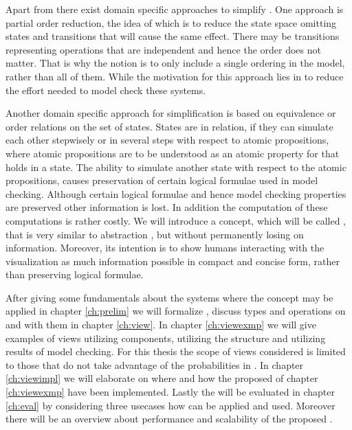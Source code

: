 \documentclass[preview]{standalone}
\begin{document}
Apart from  there exist domain specific approaches to simplify \mdpsN. One approach is partial order reduction, the idea of which is to reduce the state space omitting states and transitions that will cause the same effect. There may be transitions representing operations that are independent and hence the order does not matter. That is why the notion is to only include a single ordering in the model, rather than all of them. While the motivation for this approach lies in to reduce the effort needed to model check these systems. 

Another domain specific approach for simplification is based on equivalence or order relations on the set of states. States are in relation, if they can simulate each other stepwisely or in several steps with respect to atomic propositions, where atomic propositions are to be understood as an atomic property for that holds in a state. The ability to simulate another state with respect to the atomic propositions, causes preservation of certain logical formulae used in model checking. Although certain logical formulae and hence model checking properties are preserved other information is lost. In addition the computation of these computations is rather costly. We will introduce a concept, which will be called \viewN, that is very similar to abstraction \cite[pp. 499]{Baier2008}, but without permanently losing on information. Moreover, its intention is to show humans interacting with the visualization as much information possible in compact and concise form, rather than preserving logical formulae.

After giving some fundamentals about the systems where the concept \viewN may be applied in chapter \ref{ch:prelim} we will formalize \viewsN, discuss types and operations on and with them in chapter \ref{ch:view}. In chapter \ref{ch:viewexmp} we will give examples of views utilizing \chgphN components, \viewsN utilizing the \chgphN structure and \viewsN utilizing results of model checking. For this thesis the scope of views considered is limited to those that do not take advantage of the probabilities in \chgphsN. In chapter \ref{ch:viewimpl} we will elaborate on where and how the proposed \viewsN of chapter \ref{ch:viewexmp} have been implemented. Lastly the \viewsN will be evaluated in chapter \ref{ch:eval} by considering three usecases how \viewsN can be applied and used. Moreover there will be an overview about performance and scalability of the proposed \viewsN. 
\end{document}

